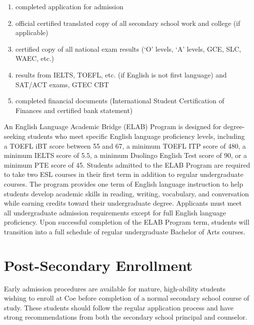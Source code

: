 \documentclass[
  letterpaper,
]{scrbook}
\providecommand{\tightlist}{%
  \setlength{\itemsep}{0pt}\setlength{\parskip}{0pt}}
\begin{document}
\begin{enumerate}
\def\labelenumi{\arabic{enumi}.}
\tightlist
\item
  completed application for admission\\
\item
  official certified translated copy of all secondary school work and
  college (if applicable)\\
\item
  certified copy of all national exam results (`O' levels, `A' levels,
  GCE, SLC, WAEC, etc.)\\
\item
  results from IELTS, TOEFL, etc. (if English is not first language) and
  SAT/ACT exams, GTEC CBT\\
\item
  completed financial documents (International Student Certification of
  Finances and certified bank statement)
\end{enumerate}

An English Language Academic Bridge (ELAB) Program is designed for
degree-seeking students who meet specific English language proficiency
levels, including a TOEFL iBT score between 55 and 67, a minimum TOEFL
ITP score of 480, a minimum IELTS score of 5.5, a minimum Duolingo
English Test score of 90, or a minimum PTE score of 45. Students
admitted to the ELAB Program are required to take two ESL courses in
their first term in addition to regular undergraduate courses. The
program provides one term of English language instruction to help
students develop academic skills in reading, writing, vocabulary, and
conversation while earning credits toward their undergraduate degree.
Applicants must meet all undergraduate admission requirements except for
full English language proficiency. Upon successful completion of the
ELAB Program term, students will transition into a full schedule of
regular undergraduate Bachelor of Arts courses.

\section{Post-Secondary Enrollment}\label{post-secondary-enrollment}

Early admission procedures are available for mature, high-ability
students wishing to enroll at Coe before completion of a normal
secondary school course of study. These students should follow the
regular application process and have strong recommendations from both
the secondary school principal and counselor.
\end{document}

